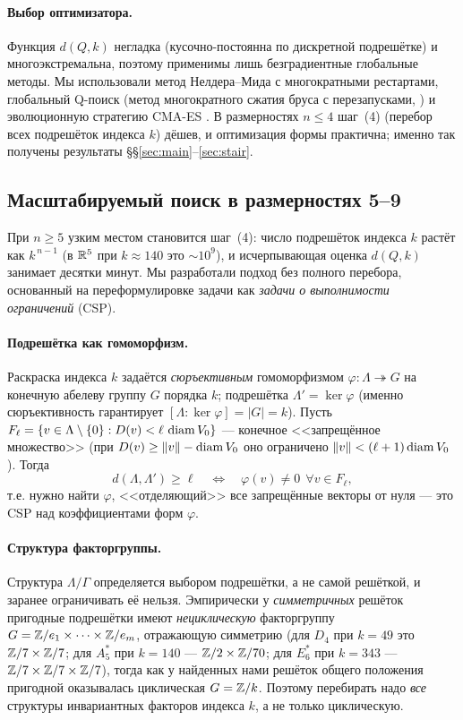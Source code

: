 \paragraph{Выбор оптимизатора.} Функция $d(Q,k)$ негладка
(кусочно-постоянна по дискретной подрешётке) и многоэкстремальна, поэтому
применимы лишь безградиентные глобальные методы. Мы использовали метод
Нелдера--Мида \cite{NelderMead} с многократными рестартами, глобальный
Q-поиск (метод многократного сжатия бруса с перезапусками, \cite{GornovQ}) и
эволюционную стратегию CMA-ES \cite{Hansen}. В размерностях $n\le4$ шаг~(4)
(перебор всех подрешёток индекса $k$) дёшев, и оптимизация формы практична;
именно так получены результаты \S\S\ref{sec:main}--\ref{sec:stair}.

\subsection{Масштабируемый поиск в размерностях 5--9}\label{sec:big}

При $n\ge5$ узким местом становится шаг~(4): число подрешёток индекса $k$ растёт
как $k^{\,n-1}$ (в $\mathbb{R}^5$ при $k\approx140$ это $\sim10^9$), и исчерпывающая
оценка $d(Q,k)$ занимает десятки минут. Мы разработали подход без полного
перебора, основанный на переформулировке задачи как \emph{задачи о выполнимости
ограничений} (CSP).

\paragraph{Подрешётка как гомоморфизм.} Раскраска индекса $k$ задаётся
\emph{сюръективным} гомоморфизмом $\varphi\colon\Lambda\twoheadrightarrow G$ на
конечную абелеву группу $G$ порядка $k$; подрешётка $\Lambda'=\ker\varphi$
(именно сюръективность гарантирует $[\Lambda:\ker\varphi]=|G|=k$). Пусть
$F_\ell=\{v\in\Lambda\setminus\{0\}:D(v)<\ell\,\operatorname{diam} V_0\}$ --- конечное
<<запрещённое множество>> (при $D(v)\ge\|v\|-\operatorname{diam} V_0$ оно ограничено
$\|v\|<(\ell+1)\operatorname{diam} V_0$). Тогда
\[
d(\Lambda,\Lambda')\ge\ell\quad\Longleftrightarrow\quad
\varphi(v)\neq0\ \ \forall v\in F_\ell,
\]
т.е. нужно найти $\varphi$, <<отделяющий>> все запрещённые векторы от нуля ---
это CSP над коэффициентами форм $\varphi$.

\paragraph{Структура факторгруппы.} Структура $\Lambda/\Gamma$ определяется
выбором подрешётки, а не самой решёткой, и заранее ограничивать её нельзя.
Эмпирически у \emph{симметричных} решёток пригодные подрешётки имеют
\emph{нециклическую} факторгруппу $G=\mathbb{Z}/e_1\times\cdots\times\mathbb{Z}/e_m$,
отражающую симметрию (для $D_4$ при $k=49$ это $\mathbb{Z}/7\times\mathbb{Z}/7$; для $A_5^*$
при $k=140$ --- $\mathbb{Z}/2\times\mathbb{Z}/70$; для $E_6^*$ при $k=343$ ---
$\mathbb{Z}/7\times\mathbb{Z}/7\times\mathbb{Z}/7$), тогда как у найденных нами решёток общего
положения пригодной оказывалась циклическая $G=\mathbb{Z}/k$. Поэтому перебирать надо
\emph{все} структуры инвариантных факторов индекса $k$, а не только
циклическую.

